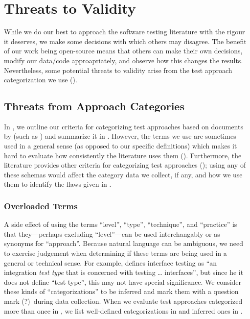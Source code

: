 \section{Threats to Validity}\label{threats}

While we do our best to approach the software testing literature with the
rigour it deserves, we make some decisions with which others may disagree. The
benefit of our work being open-source means that others can make their own
decisions, modify our data/code approapriately, and observe how this changes
the results. Nevertheless, some potential threats to validity arise from the
test approach categorization we use ().

\subsection{Threats from Approach Categories}\label{cat-threats}

In , we outline our criteria for categorizing test approaches
based on documents by \citeauthor{IEEE2022} (such as \citeyear[Fig.~2]{IEEE2022})
and summarize it in . However, the terms we use are
sometimes used in a general sense (as opposed to our specific definitions)
which makes it hard to evaluate how consistently the literature uses them
(). Furthermore, the literature provides other criteria
for categorizing test approaches (); using any of these schemas
would affect the category data we collect, if any, and how we use them to
identify the flaws given in .

\subsubsection{Overloaded Terms}\label{overloaded-cats}

A side effect of using the terms ``level'', ``type'', ``technique'', and
``practice'' is that they---perhaps excluding ``level''---can be used
interchangably or as synonyms for ``approach''. Because natural language can be
ambiguous, we need to exercise judgement when determining if these terms are
being used in a general or technical sense. For example,
\citet[p.~45\ifnotpaper, emphasis added\fi]{Kam2008}
defines interface testing as ``an integration \emph{test type} that is
concerned with testing \dots{} interfaces'', but since \ifnotpaper he \else it
\fi does not define ``test type'', this may not have special significance.
\ifnotpaper We consider these kinds of ``categorizations'' to be
    inferred and mark them with a question mark (?)~during data collection.
    When we evaluate test approaches categorized more than once in
    , we list well-defined categorizations in
     and inferred ones in .
\fi

